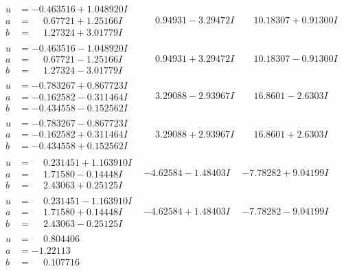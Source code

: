 \documentclass[1p]{elsarticle_modified}
\theoremstyle{definition}
\begin{document}
$$\begin{array}{c|c|c}
\begin{aligned}
u &= -0.463516 + 1.048920 I \\
a &= \phantom{-}0.67721 + 1.25166 I \\
b &= \phantom{-}1.27324 + 3.01779 I\end{aligned}
 & \phantom{-}0.94931 - 3.29472 I & \phantom{-}10.18307 + 0.91300 I \\ \hline\begin{aligned}
u &= -0.463516 - 1.048920 I \\
a &= \phantom{-}0.67721 - 1.25166 I \\
b &= \phantom{-}1.27324 - 3.01779 I\end{aligned}
 & \phantom{-}0.94931 + 3.29472 I & \phantom{-}10.18307 - 0.91300 I \\ \hline\begin{aligned}
u &= -0.783267 + 0.867723 I \\
a &= -0.162582 - 0.311464 I \\
b &= -0.434558 - 0.152562 I\end{aligned}
 & \phantom{-}3.29088 - 2.93967 I & \phantom{-}16.8601 - 2.6303 I \\ \hline\begin{aligned}
u &= -0.783267 - 0.867723 I \\
a &= -0.162582 + 0.311464 I \\
b &= -0.434558 + 0.152562 I\end{aligned}
 & \phantom{-}3.29088 + 2.93967 I & \phantom{-}16.8601 + 2.6303 I \\ \hline\begin{aligned}
u &= \phantom{-}0.231451 + 1.163910 I \\
a &= \phantom{-}1.71580 - 0.14448 I \\
b &= \phantom{-}2.43063 + 0.25125 I\end{aligned}
 & -4.62584 - 1.48403 I & -7.78282 + 9.04199 I \\ \hline\begin{aligned}
u &= \phantom{-}0.231451 - 1.163910 I \\
a &= \phantom{-}1.71580 + 0.14448 I \\
b &= \phantom{-}2.43063 - 0.25125 I\end{aligned}
 & -4.62584 + 1.48403 I & -7.78282 - 9.04199 I \\ \hline\begin{aligned}
u &= \phantom{-}0.804406\phantom{ +0.000000I} \\
a &= -1.22113\phantom{ +0.000000I} \\
b &= \phantom{-}0.107716\phantom{ +0.000000I}\end{aligned}

\end{array}$$
\end{document}
